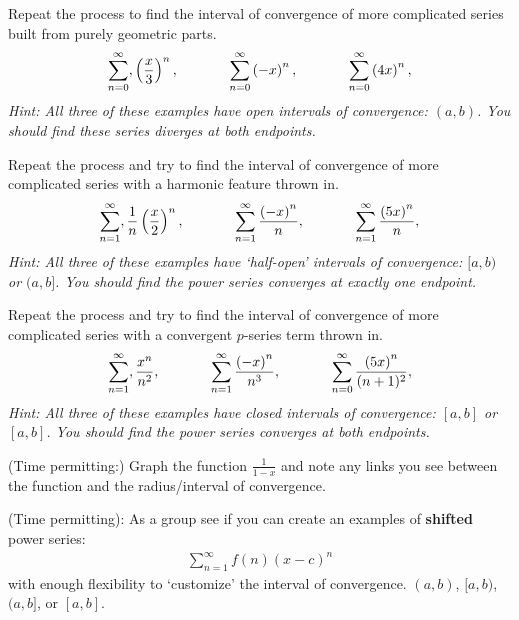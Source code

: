 \documentclass{ximera}
\begin{document}
\begin{exercise}
Repeat the process to find the interval of convergence of more complicated series built from purely geometric parts. 
\begin{align}
	\sum_{n=0}^\infty, \left(\frac{x}{3}\right)^n, \hspace{.5in} \sum_{n=0}^\infty \left(-x\right)^n, \hspace{.5in} \sum_{n=0}^\infty \left(4x\right)^n,\nonumber
\end{align}
\textit{Hint: All three of these examples have open intervals of convergence: $(a,b)$. You should find these series diverges at both endpoints.}
\end{exercise}

\begin{exercise}
Repeat the process and try to find the interval of convergence of more complicated series with a harmonic feature thrown in. 
\begin{align}
	\sum_{n=1}^\infty, \frac{1}{n}\left(\frac{x}{2}\right)^n, \hspace{.5in} \sum_{n=1}^\infty \frac{\left(-x\right)^n}{n}, \hspace{.5in} \sum_{n=1}^\infty \frac{\left(5x\right)^n}{n},\nonumber
\end{align}
\textit{Hint: All three of these examples have `half-open' intervals of convergence: $[a,b)$ or $(a,b]$. You should find the power series converges at exactly one endpoint.}

\end{exercise}

\begin{exercise}
Repeat the process and try to find the interval of convergence of more complicated series with a convergent $p$-series term thrown in.  
\begin{align}
	\sum_{n=1}^\infty, \frac{x^n}{n^2}, \hspace{.5in} \sum_{n=1}^\infty \frac{\left(-x\right)^n}{n^3}, \hspace{.5in} \sum_{n=0}^\infty \frac{\left(5x\right)^n}{(n+1)^2},\nonumber
\end{align}
\textit{Hint: All three of these examples have closed intervals of convergence: $[a,b]$ or $[a,b]$. You should find the power series converges at both endpoints.}
\end{exercise}

\begin{exercise}
(Time permitting:) Graph the function $\frac{1}{1-x}$ and note any links you see between the function and the radius/interval of convergence.
\end{exercise}

\begin{exercise}
(Time permitting): As a group see if you can create an examples of {\bf{shifted}} power series:
\begin{align}
	\sum_{n=1}^\infty f(n)(x-c)^n\nonumber
\end{align}
with enough flexibility to `customize' the interval of convergence. $(a,b)$, $[a,b)$, $(a,b]$, or $[a,b]$.

\end{exercise}
\end{document}

